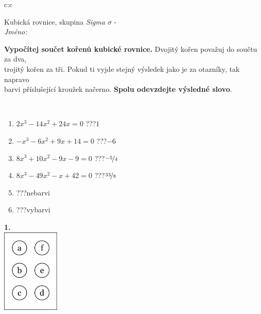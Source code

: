 \documentclass[10pt]{report}
\begin{document}
\begin{tabular}{c:c}
\begin{minipage}[c][104.5mm][t]{0.5\linewidth}
\begin{center}
\vspace{7mm}
{\huge Kubická rovnice, skupina \textit{Sigma $\sigma$} -}\\[5mm]
\textit{Jméno:}\phantom{xxxxxxxxxxxxxxxxxxxxxxxxxxxxxxxxxxxxxxxxxxxxxxxxxxxxxxxxxxxxxxxxx}\\[5mm]
\begin{minipage}{0.95\linewidth}
\begin{center}
\textbf{Vypočítej součet kořenů kubické rovnice.} Dvojitý kořen považuj do součtu za dva,\\trojitý kořen za tři. Pokud ti vyjde stejný výsledek jako je za otazníky, tak napravo\\barvi příslušející kroužek načerno. \textbf{Spolu odevzdejte výsledné slovo}.
\end{center}
\end{minipage}
\\[1mm]
\begin{minipage}{0.79\linewidth}
\begin{center}
\begin{varwidth}{\linewidth}
\begin{enumerate}
\Large
\item $2x^3-14x^2+24x=0$\quad \dotfill\; ???\;\dotfill \quad $1$
\item $-x^3-6x^2+9x+14=0$\quad \dotfill\; ???\;\dotfill \quad $-6$
\item $8x^3+10x^2-9x-9=0$\quad \dotfill\; ???\;\dotfill \quad $\nicefrac{-5}{4}$
\item $8x^3-49x^2-x+42=0$\quad \dotfill\; ???\;\dotfill \quad $\nicefrac{33}{8}$
\item \quad \dotfill\; ???\;\dotfill \quad nebarvi
\item \quad \dotfill\; ???\;\dotfill \quad vybarvi
\end{enumerate}
\end{varwidth}
\end{center}
\end{minipage}
\begin{minipage}{0.20\linewidth}
\begin{center}
{\Huge\bfseries 1.} \\[2mm]
\includegraphics[height=40mm]{../images/braille.png}

\end{center}
\end{minipage}
\end{center}
\end{minipage}
\end{tabular}
\end{document}
